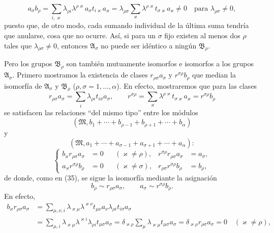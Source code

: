 \documentclass[11pt]{article}
\begin{document}
\[
 a_\sigma b_\rho
 =\sum_{i,\varkappa}\lambda_{\rho i}\lambda^{\rho\varkappa}a_\sigma t_{i\varkappa}a_\varkappa
 =\lambda_{\rho\sigma}
 \sum_\varkappa\lambda^{\rho\varkappa}t_{\sigma\varkappa}a_\varkappa\ne0
 \quad\text{para }\lambda_{\rho\sigma}\ne0,
\]
puesto que, de otro modo, cada sumando individual de la última suma tendría que anularse, cosa que no ocurre. Así, si para un $\sigma$ fijo existen al menos dos $\rho$ tales que $\lambda_{\rho\sigma}\ne0$, entonces $\mathfrak A_\sigma$ no puede ser idéntico a ningún $\mathfrak B_\rho$.

Pero los grupos $\mathfrak B_\rho$ son también mutuamente isomorfos e isomorfos a los grupos $\mathfrak A_\sigma$. Primero mostramos la existencia de clases $r_{\rho\sigma}a_\sigma$ y $r^{\sigma\rho}b_\rho$ que median la isomorfía de $\mathfrak A_\sigma$ y $\mathfrak B_\rho$ ($\rho,\sigma=1,\ldots,\alpha$). En efecto, mostraremos que para las clases
\[
 r_{\rho\sigma}a_\sigma=\sum_i\lambda_{\rho i}t_{i\sigma}a_\sigma,
 \qquad
 r^{\sigma\rho}=\sum_\varkappa\lambda^{\rho\varkappa}t_{\sigma\varkappa}a_\varkappa
 =r^{\sigma\rho}b_\rho
\]
se satisfacen las relaciones ``del mismo tipo'' entre los módulos
\[
 (\mathfrak M,b_1+\cdots+b_{\rho-1}+b_{\rho+1}+\cdots+b_\alpha)
\]
y
\[
 (\mathfrak M,a_1+\cdots+a_{\sigma-1}+a_{\sigma+1}+\cdots+a_\alpha):
\]
\begin{equation}
\left\{
\begin{aligned}
 b_\varkappa r_{\rho\sigma}a_\sigma&=0 &&(\varkappa\ne\rho),&
 r^{\sigma\rho}r_{\rho\sigma}a_\sigma&=a_\sigma,\\
 a_\varkappa r^{\sigma\rho}b_\rho&=0 &&(\varkappa\ne\sigma),&
 r_{\rho\sigma}r^{\sigma\rho}b_\rho&=b_\rho,
\end{aligned}\right.
\tag{39}
\end{equation}
de donde, como en (35), se sigue la isomorfía mediante la asignación
\begin{equation}
 b_\rho\sim r_{\rho\sigma}a_\sigma,
 \qquad
 a_\sigma\sim r^{\sigma\rho}b_\rho.
\tag{40}
\end{equation}
En efecto,
\[
\begin{aligned}
 b_\varkappa r_{\rho\sigma}a_\sigma
 &=\sum_{\mu,\nu,i}\lambda_{\varkappa\mu}\lambda^{\varkappa\nu}t_{\mu\nu}a_\nu\lambda_{\rho i}t_{i\sigma}a_\sigma\\
 &=\sum_{\mu,i}\lambda_{\varkappa\mu}\lambda^{\varkappa i}\lambda_{\rho i}t_{\mu\sigma}a_\sigma
 =\delta_{\varkappa\rho}\sum_\mu\lambda_{\varkappa\mu}t_{\mu\sigma}a_\sigma
 =\delta_{\varkappa\rho}r_{\rho\sigma}a_\sigma=0\quad(\varkappa\ne\rho),
\end{aligned}
\]
\end{document}
